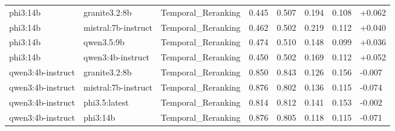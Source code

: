 \begin{table}
\begin{tabular}{llllllll}
phi3:14b & granite3.2:8b & Temporal_Reranking & 0.445 & 0.507 & 0.194 & 0.108 & +0.062 \\
phi3:14b & mistral:7b-instruct & Temporal_Reranking & 0.462 & 0.502 & 0.219 & 0.112 & +0.040 \\
phi3:14b & qwen3.5:9b & Temporal_Reranking & 0.474 & 0.510 & 0.148 & 0.099 & +0.036 \\
phi3:14b & qwen3:4b-instruct & Temporal_Reranking & 0.450 & 0.502 & 0.169 & 0.112 & +0.052 \\
qwen3:4b-instruct & granite3.2:8b & Temporal_Reranking & 0.850 & 0.843 & 0.126 & 0.156 & -0.007 \\
qwen3:4b-instruct & mistral:7b-instruct & Temporal_Reranking & 0.876 & 0.802 & 0.136 & 0.115 & -0.074 \\
qwen3:4b-instruct & phi3.5:latest & Temporal_Reranking & 0.814 & 0.812 & 0.141 & 0.153 & -0.002 \\
qwen3:4b-instruct & phi3:14b & Temporal_Reranking & 0.876 & 0.805 & 0.118 & 0.115 & -0.071 \\
\bottomrule
\end{tabular}
\end{table}
